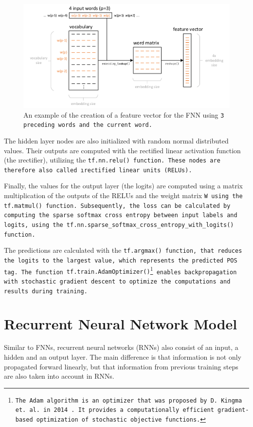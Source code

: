 \begin{figure}[ht]
	\vspace{1.5em}
	\hspace{-1.5em}\includegraphics[width=1.1\textwidth]{images/feature_vector}
	\caption[Creation of the feature vector]{An example of the creation of a feature vector for the FNN using \tt{3} preceding words and the current word.}
	\label{f.fnn.feature}
	\vspace{.5em}
\end{figure}

The hidden layer nodes are also initialized with random normal distributed values. Their outputs are computed with the rectified linear activation function (the \i{rectifier}), utilizing the \tt{tf.nn.relu()} function. These nodes are therefore also called \i{rectified linear units} (RELUs).

Finally, the values for the output layer (the logits) are computed using a matrix multiplication of the outputs of the RELUs and the weight matrix \tt{W} using the \tt{tf.matmul()} function. Subsequently, the loss can be calculated by computing the sparse softmax cross entropy between input labels and logits, using the \tt{tf.nn.sparse\_softmax\_cross\_entropy\_with\_logits()} function.

The predictions are calculated with the \tt{tf.argmax()} function, that reduces the logits to the largest value, which represents the predicted POS tag. The function \tt{tf.train.AdamOptimizer()}\footnote{The Adam algorithm is an optimizer that was proposed by D. Kingma et. al. in 2014 \cite{kingma2014}. It provides a computationally efficient gradient-based optimization of stochastic objective functions.} enables backpropagation with stochastic gradient descent to optimize the computations and results during training.


\section{Recurrent Neural Network Model}\label{c.postagging.rnn}
Similar to FNNs, recurrent neural networks (RNNs) also consist of an input, a hidden and an output layer. The main difference is that information is not only propagated forward linearly, but that information from previous training steps are also taken into account in RNNs.

